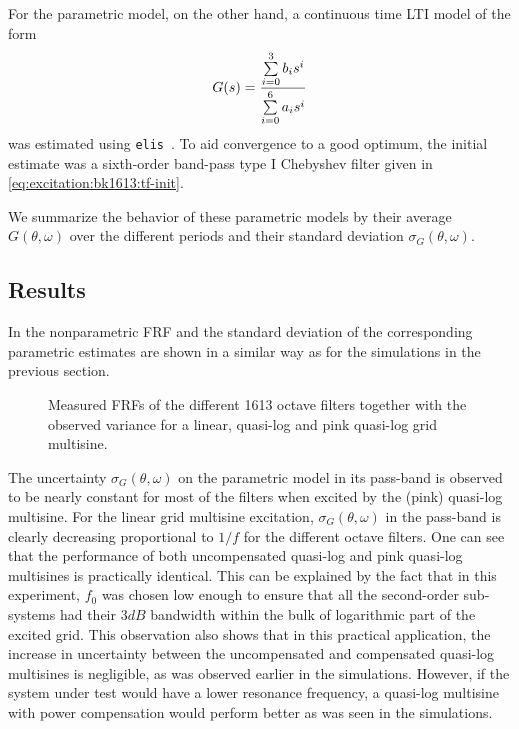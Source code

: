     For the parametric model, on the other hand, a continuous time \gls{LTI} model of the form
    \begin{equation}
      G(s) = \frac{\sum\limits_{i=0}^3 b_i s^i}{\sum\limits_{i=0}^6 a_i s^i}
    \end{equation}
    was estimated using \texttt{elis}~\citep{FDIDENT}.
    To aid convergence to a good optimum, the initial estimate was a sixth-order band-pass type I Chebyshev filter given in \eqref{eq:excitation:bk1613:tf-init}.

    We summarize the behavior of these parametric models by their average $G\left(\theta,\omega \right)$ over the different periods and their standard deviation $\sigma_G\left(\theta,\omega \right)$.

    \subsection{Results}
    In  the nonparametric \gls{FRF} and the standard deviation of the corresponding parametric estimates are shown in a similar way as for the simulations in the previous section.

    \begin{figure}[t]
    \centering
      \setlength{}
      \setlength\figureheight{0.62\figurewidth}
    
    \caption[Measurements of all BK1613 octave filters using different excitation signals.]{Measured FRFs of the different \bruelkjaer{} 1613 octave filters together with the observed variance for a linear, quasi-log and pink quasi-log grid multisine.}
      \label{fig:excitation:measurements}
    \end{figure}

    The uncertainty $\sigma_G\left(\theta,\omega\right)$ on the parametric model in its pass-band is observed to be nearly constant for most of the filters when excited by the (pink) quasi-log multisine.
    For the linear grid multisine excitation, $\sigma_G\left(\theta,\omega\right)$ in the pass-band is clearly decreasing proportional to $1 / f$ for the different octave filters.
    One can see that the performance of both uncompensated quasi-log and pink quasi-log multisines is practically identical.
    This can be explained by the fact that in this experiment, $f_0$ was chosen low enough to ensure that all the second-order sub-systems had their $3\unit{dB}$ bandwidth within the bulk of logarithmic part of the excited grid.
    This observation also shows that in this practical application, the increase in uncertainty between the uncompensated and compensated quasi-log multisines is negligible, as was observed earlier in the simulations.
    However, if the system under test would have a lower resonance frequency, a quasi-log multisine with power compensation would perform better as was seen in the simulations.

